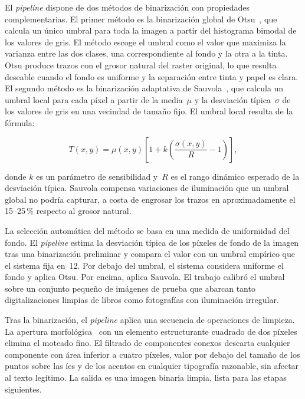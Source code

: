 El \textit{pipeline} dispone de dos métodos de binarización con propiedades complementarias. El primer método es la binarización global de Otsu~\cite{otsu1979threshold}, que calcula un único umbral para toda la imagen a partir del histograma bimodal de los valores de gris. El método escoge el umbral como el valor que maximiza la varianza entre las dos clases, una correspondiente al fondo y la otra a la tinta. Otsu produce trazos con el grosor natural del raster original, lo que resulta deseable cuando el fondo es uniforme y la separación entre tinta y papel es clara. El segundo método es la binarización adaptativa de Sauvola~\cite{sauvola2000binarization}, que calcula un umbral local para cada píxel a partir de la media~$\mu$ y la desviación típica~$\sigma$ de los valores de gris en una vecindad de tamaño fijo. El umbral local resulta de la fórmula:

\begin{equation}
	T(x, y) = \mu(x, y)\left[1 + k \left(\frac{\sigma(x, y)}{R} - 1\right)\right],
	\label{eq:sauvola}
\end{equation}

donde $k$ es un parámetro de sensibilidad y~$R$ es el rango dinámico esperado de la desviación típica. Sauvola compensa variaciones de iluminación que un umbral global no podría capturar, a costa de engrosar los trazos en aproximadamente el 15--25\,\% respecto al grosor natural.

La selección automática del método se basa en una medida de uniformidad del fondo. El \textit{pipeline} estima la desviación típica de los píxeles de fondo de la imagen tras una binarización preliminar y compara el valor con un umbral empírico que el sistema fija en~12. Por debajo del umbral, el sistema considera uniforme el fondo y aplica Otsu. Por encima, aplica Sauvola. El trabajo calibró el umbral sobre un conjunto pequeño de imágenes de prueba que abarcan tanto digitalizaciones limpias de libros como fotografías con iluminación irregular.

Tras la binarización, el \textit{pipeline} aplica una secuencia de operaciones de limpieza. La apertura morfológica~\cite{soille2003morphology} con un elemento estructurante cuadrado de dos píxeles elimina el moteado fino. El filtrado de componentes conexos descarta cualquier componente con área inferior a cuatro píxeles, valor por debajo del tamaño de los puntos sobre las íes y de los acentos en cualquier tipografía razonable, sin afectar al texto legítimo. La salida es una imagen binaria limpia, lista para las etapas siguientes.

